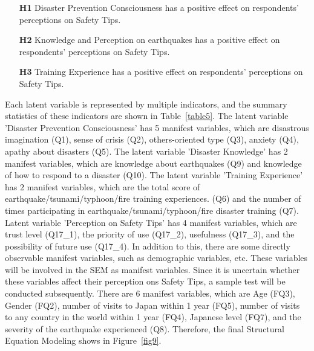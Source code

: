 \begin{itemize}
\item[\textbf{H1}] Disaster Prevention Consciousness has a positive effect on respondents' perceptions on Safety Tips.
\item[\textbf{H2}] Knowledge and Perception on earthquakes has a positive effect on respondents' perceptions on Safety Tips.
\item[\textbf{H3}] Training Experience has a positive effect on respondents' perceptions on Safety Tips.
\end{itemize}


Each latent variable is represented by multiple indicators, and the summary statistics of these indicators are shown in Table~\ref{table5}. The latent variable 'Disaster Prevention Consciousness' has 5 manifest variables, which are disastrous imagination (Q1), sense of crisis (Q2), others-oriented type (Q3), anxiety (Q4), apathy about disasters (Q5). The latent variable 'Disaster Knowledge' has 2 manifest variables, which are knowledge about earthquakes (Q9) and knowledge of how to respond to a disaster (Q10). The latent variable 'Training Experience' has 2 manifest variables, which are the total score of earthquake/tsunami/typhoon/fire training experiences. (Q6) and the number of times participating in earthquake/tsunami/typhoon/fire disaster training (Q7). Latent variable 'Perception on Safety Tips' has 4 manifest variables, which are trust level (Q17\_1), the priority of use (Q17\_2), usefulness (Q17\_3), and the possibility of future use (Q17\_4). In addition to this, there are some directly observable manifest variables, such as demographic variables, etc. These variables will be involved in the SEM as manifest variables. Since it is uncertain whether these variables affect their perception ons Safety Tips, a sample test will be conducted subsequently. There are 6 manifest variables, which are Age (FQ3), Gender (FQ2), number of visits to Japan within 1 year (FQ5), number of visits to any country in the world within 1 year (FQ4), Japanese level (FQ7), and the severity of the earthquake experienced (Q8). Therefore, the final Structural Equation Modeling shows in Figure~\ref{fig9}.

